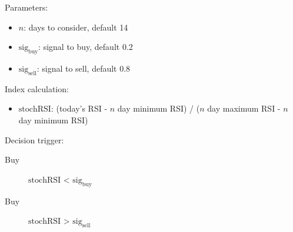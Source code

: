 \documentclass{article}
\begin{document}
Parameters\cite{stock-market-prediction-model-using-TPWS}:
\begin{itemize}
    \item $n$: days to consider, default 14
    \item $\text{sig}_{\text{buy}}$: signal to buy, default 0.2
    \item $\text{sig}_{\text{sell}}$: signal to sell, default 0.8
\end{itemize}

Index calculation:
\begin{itemize}
    \item $\text{stochRSI}$: (today's RSI - $n$ day minimum RSI) /  ($n$ day maximum RSI - $n$ day minimum RSI)
\end{itemize}

Decision trigger:
\begin{description}
    \item[Buy] $\text{stochRSI}$ < $\text{sig}_{\text{buy}}$
    \item[Buy] $\text{stochRSI}$ > $\text{sig}_{\text{sell}}$
\end{description}

\end{document}
